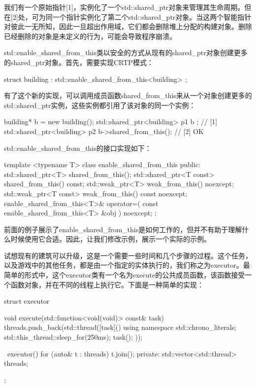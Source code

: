 我们有一个原始指针[1]，实例化了一个std::shared\_ptr对象来管理其生命周期。但在[2]处，可为同一个指针实例化了第二个std::shared\_ptr对象。当这两个智能指针对彼此一无所知，因此一旦超出作用域，它们都会删除堆上分配的构建对象。删除已经删除的对象是未定义的行为，可能会导致程序崩溃。

std::enable\_shared\_from\_this类以安全的方式从现有的shared\_ptr对象创建更多的shared\_ptr对象。首先，需要实现CRTP模式：

\begin{cpp}
struct building : std::enable_shared_from_this<building>
{
};
\end{cpp}

有了这个新的实现，可以调用成员函数shared\_from\_this来从一个对象创建更多的std::shared\_ptr实例，这些实例都引用了该对象的同一个实例：

\begin{cpp}
building* b = new building();
std::shared_ptr<building> p1{ b }; // [1]
std::shared_ptr<building> p2{
	b->shared_from_this()}; // [2] OK
\end{cpp}

std::enable\_shared\_from\_this的接口实现如下：

\begin{cpp}
template <typename T>
class enable_shared_from_this
{
	public:
	std::shared_ptr<T> shared_from_this();
	std::shared_ptr<T const> shared_from_this() const;
	std::weak_ptr<T> weak_from_this() noexcept;
	std::weak_ptr<T const> weak_from_this() const noexcept;
	enable_shared_from_this<T>& operator=(
		const enable_shared_from_this<T> &obj ) noexcept;
};
\end{cpp}

前面的例子展示了enable\_shared\_from\_this是如何工作的，但并不有助于理解什么时候使用它合适。因此，让我们修改示例，展示一个实际的示例。

试想现有的建筑可以升级，这是一个需要一些时间和几个步骤的过程。这个任务，以及游戏中的其他任务，都是由一个指定的实体执行的，我们称之为executor。最简单的形式中，这个executor类有一个名为execute的公共成员函数，该函数接受一个函数对象，并在不同的线程上执行它。下面是一种简单的实现：

\begin{cpp}
struct executor
{
	void execute(std::function<void(void)> const& task)
	{
		threads.push_back(std::thread([task]() {
			using namespace std::chrono_literals;
			std::this_thread::sleep_for(250ms);
			task();
		}));
	}

	~executor()
	{
		for (auto& t : threads)
		t.join();
	}
private:
	std::vector<std::thread> threads;
};
\end{cpp}

